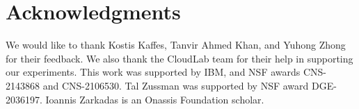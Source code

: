 \section{Acknowledgments}
We would like to thank Kostis Kaffes, Tanvir Ahmed Khan, and Yuhong Zhong for their feedback.
We also thank the CloudLab team for their help in supporting our experiments.
This work was supported by IBM, and NSF awards CNS-2143868 and CNS-2106530.
Tal Zussman was supported by NSF award DGE-2036197.
Ioannis Zarkadas is an Onassis Foundation scholar.
